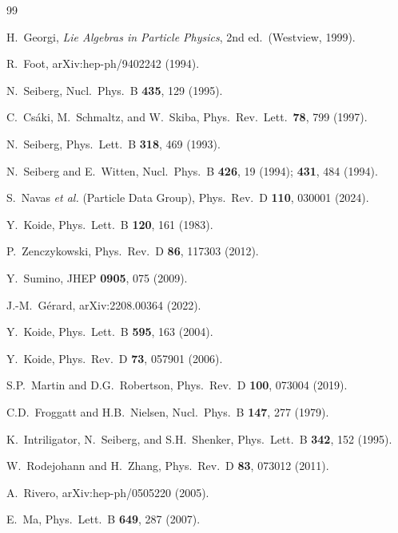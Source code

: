 \documentclass[preprint,12pt]{elsarticle}
\begin{document}
\begin{thebibliography}{99}

  H.~Georgi,
  \textit{Lie Algebras in Particle Physics},
  2nd ed.\ (Westview, 1999).

  R.~Foot,
  arXiv:hep-ph/9402242 (1994).

  N.~Seiberg,
  Nucl.\ Phys.\ B \textbf{435}, 129 (1995).

  C.~Cs\'aki, M.~Schmaltz, and W.~Skiba,
  Phys.\ Rev.\ Lett.\ \textbf{78}, 799 (1997).

  N.~Seiberg,
  Phys.\ Lett.\ B \textbf{318}, 469 (1993).

  N.~Seiberg and E.~Witten,
  Nucl.\ Phys.\ B \textbf{426}, 19 (1994);
  \textbf{431}, 484 (1994).

  S.~Navas \textit{et al.} (Particle Data Group),
  Phys.\ Rev.\ D \textbf{110}, 030001 (2024).

  Y.~Koide,
  Phys.\ Lett.\ B \textbf{120}, 161 (1983).

  P.~Zenczykowski,
  Phys.\ Rev.\ D \textbf{86}, 117303 (2012).

  Y.~Sumino,
  JHEP \textbf{0905}, 075 (2009).

  J.-M.~G\'erard,
  arXiv:2208.00364 (2022).

  Y.~Koide,
  Phys.\ Lett.\ B \textbf{595}, 163 (2004).

  Y.~Koide,
  Phys.\ Rev.\ D \textbf{73}, 057901 (2006).

  S.P.~Martin and D.G.~Robertson,
  Phys.\ Rev.\ D \textbf{100}, 073004 (2019).

  C.D.~Froggatt and H.B.~Nielsen,
  Nucl.\ Phys.\ B \textbf{147}, 277 (1979).

  K.~Intriligator, N.~Seiberg, and S.H.~Shenker,
  Phys.\ Lett.\ B \textbf{342}, 152 (1995).

  W.~Rodejohann and H.~Zhang,
  Phys.\ Rev.\ D \textbf{83}, 073012 (2011).

  A.~Rivero,
  arXiv:hep-ph/0505220 (2005).

  E.~Ma,
  Phys.\ Lett.\ B \textbf{649}, 287 (2007).

\end{thebibliography}
\end{document}
